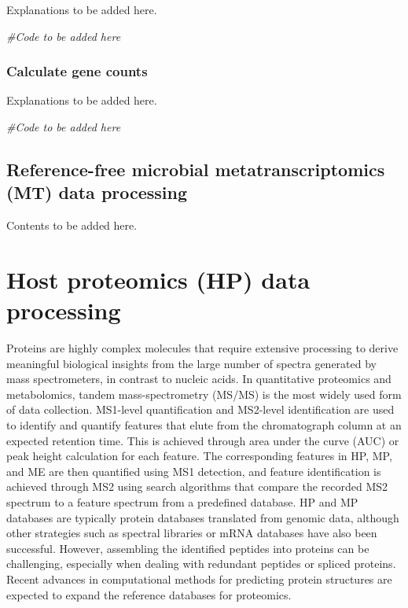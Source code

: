 \documentclass[
]{book}
\newenvironment{Shaded}{\begin{snugshade}}{\end{snugshade}}
\newcommand{\CommentTok}[1]{\textcolor[rgb]{0.56,0.35,0.01}{\textit{#1}}}
\begin{document}
Explanations to be added here.

\begin{Shaded}
\begin{Highlighting}[]
\CommentTok{\#Code to be added here}
\end{Highlighting}
\end{Shaded}

\hypertarget{calculate-gene-counts}{%
\subsection*{Calculate gene counts}\label{calculate-gene-counts}}

Explanations to be added here.

\begin{Shaded}
\begin{Highlighting}[]
\CommentTok{\#Code to be added here}
\end{Highlighting}
\end{Shaded}

\hypertarget{microbial-metatranscriptomics-data-processing-reference-free}{%
\section{Reference-free microbial metatranscriptomics (MT) data processing}\label{microbial-metatranscriptomics-data-processing-reference-free}}

Contents to be added here.

\hypertarget{host-proteomics-data-processing}{%
\chapter{Host proteomics (HP) data processing}\label{host-proteomics-data-processing}}

Proteins are highly complex molecules that require extensive processing to derive meaningful biological insights from the large number of spectra generated by mass spectrometers, in contrast to nucleic acids. In quantitative proteomics and metabolomics, tandem mass-spectrometry (MS/MS) is the most widely used form of data collection. MS1-level quantification and MS2-level identification are used to identify and quantify features that elute from the chromatograph column at an expected retention time. This is achieved through area under the curve (AUC) or peak height calculation for each feature. The corresponding features in HP, MP, and ME are then quantified using MS1 detection, and feature identification is achieved through MS2 using search algorithms that compare the recorded MS2 spectrum to a feature spectrum from a predefined database. HP and MP databases are typically protein databases translated from genomic data, although other strategies such as spectral libraries or mRNA databases have also been successful. However, assembling the identified peptides into proteins can be challenging, especially when dealing with redundant peptides or spliced proteins. Recent advances in computational methods for predicting protein structures are expected to expand the reference databases for proteomics.
\end{document}

